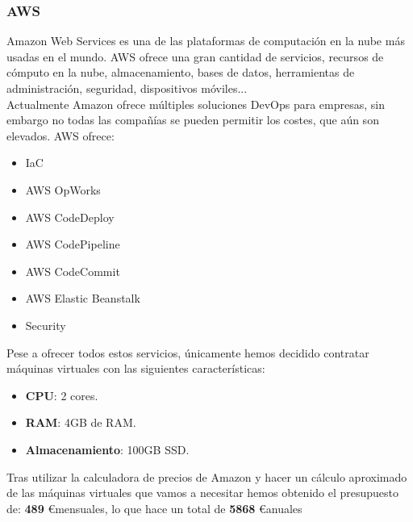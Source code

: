 		\subsubsection{AWS}
			\begin{text}
				Amazon Web Services es una de las plataformas de computación en la nube más usadas en el mundo. 
				AWS ofrece una gran cantidad de servicios, recursos de cómputo en la nube, almacenamiento, bases de datos, herramientas de administración, seguridad, dispositivos móviles... \\
				Actualmente Amazon ofrece múltiples soluciones DevOps para empresas, sin embargo no todas las compañías se pueden permitir los costes, que aún son elevados. AWS ofrece:
				
				\clearpage
				\begin{itemize}
					\item IaC
					\item AWS OpWorks
					\item AWS CodeDeploy	
					\item AWS CodePipeline
					\item AWS CodeCommit
					\item AWS Elastic Beanstalk
					\item Security
				\end{itemize}
			
			Pese a ofrecer todos estos servicios, únicamente hemos decidido contratar máquinas virtuales con las siguientes características:
			
			\begin{itemize}
				\item \textbf{CPU}: 2 cores.
				\item \textbf{RAM}: 4GB de RAM.
				\item \textbf{Almacenamiento}: 100GB SSD.
			\end{itemize}
			
			Tras utilizar la calculadora de precios de Amazon \cite{amazoncalculadora:online} y hacer un cálculo aproximado de las máquinas virtuales que vamos a necesitar hemos obtenido el presupuesto de: \textbf{489} \euro \space  mensuales, lo que hace un total de \textbf{5868} \euro \space anuales
				
			\end{text}
		
